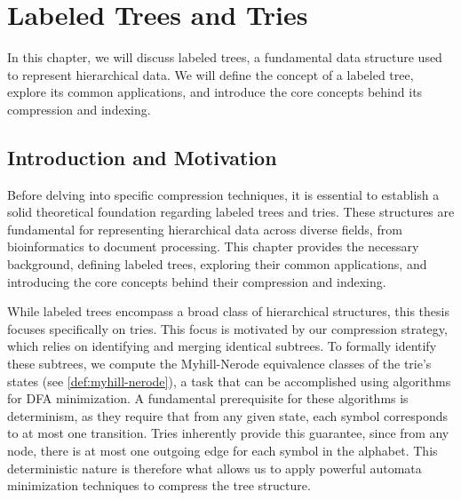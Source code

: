 \section{Labeled Trees and Tries} \label{chp:thbg_labeled_tree}
In this chapter, we will discuss labeled trees, a fundamental data structure used to represent hierarchical data. We will define the concept of a labeled tree, explore its common applications, and introduce the core concepts behind its compression and indexing.

\subsection{Introduction and Motivation}
Before delving into specific compression techniques, it is essential to establish a solid theoretical foundation regarding labeled trees and tries. These structures are fundamental for representing hierarchical data across diverse fields, from bioinformatics to document processing. This chapter provides the necessary background, defining labeled trees, exploring their common applications, and introducing the core concepts behind their compression and indexing. 

While labeled trees encompass a broad class of hierarchical structures, this thesis focuses specifically on tries. This focus is motivated by our compression strategy, which relies on identifying and merging identical subtrees. To formally identify these subtrees, we compute the Myhill-Nerode equivalence classes of the trie's states (see \cref{def:myhill-nerode}), a task that can be accomplished using algorithms for DFA minimization. A fundamental prerequisite for these algorithms is determinism, as they require that from any given state, each symbol corresponds to at most one transition. Tries inherently provide this guarantee, since from any node, there is at most one outgoing edge for each symbol in the alphabet. This deterministic nature is therefore what allows us to apply powerful automata minimization techniques to compress the tree structure. 

